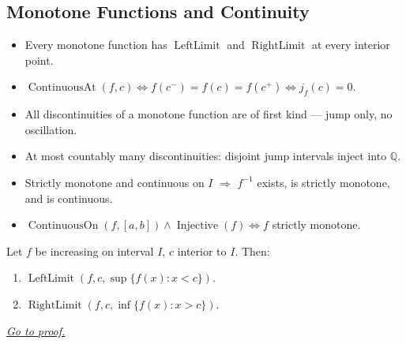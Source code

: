 
\subsection{Monotone Functions and Continuity}
\label{sec:monotone-functions}

\begin{tcolorbox}[title={Toolkit --- Monotone Functions}]
\begin{itemize}
  \item Every monotone function has $\operatorname{LeftLimit}$ and
    $\operatorname{RightLimit}$ at every interior point.
  \item $\operatorname{ContinuousAt}(f,c)\iff f(c^-)=f(c)=f(c^+)
    \iff j_f(c)=0$.
  \item All discontinuities of a monotone function are of first kind
    — jump only, no oscillation.
  \item At most countably many discontinuities: disjoint jump
    intervals inject into $\mathbb{Q}$.
  \item Strictly monotone and continuous on $I$ $\Rightarrow$
    $f^{-1}$ exists, is strictly monotone, and is continuous.
  \item $\operatorname{ContinuousOn}(f,[a,b])\wedge\operatorname{Injective}(f)
    \iff f$ strictly monotone.
\end{itemize}
\end{tcolorbox}


\begin{theorem}
\label{thm:monotone-one-sided-limits}
Let $f$ be increasing on interval $I$, $c$ interior to $I$. Then:
\begin{enumerate}[label=(\roman*)]
  \item $\operatorname{LeftLimit}(f,c,\sup\{f(x):x<c\})$.
  \item $\operatorname{RightLimit}(f,c,\inf\{f(x):x>c\})$.
\end{enumerate}

\smallskip\noindent
\hyperref[prf:monotone-one-sided-limits]{\textit{Go to proof.}}
\end{theorem}

